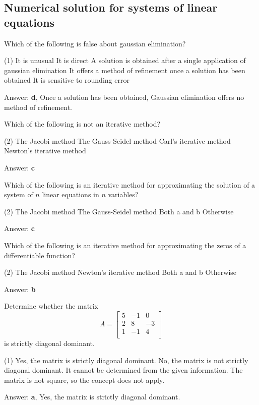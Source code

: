 \documentclass{exam}
\begin{document}
\begin{questions}
	\section{Numerical solution for systems of linear equations}

	\question Which of the following is false about gaussian elimination?
	\begin{tasks}(1)
		\task It is unusual
		\task It is direct
		\task A solution is obtained after a single application of gaussian elimination
		\task It offers a method of refinement once a solution has been obtained
		\task It is sensitive to rounding error
	\end{tasks}
	Answer: \textbf{d}, Once a solution has been obtained, Gaussian elimination offers no method of refinement.

	\question Which of the following is not an iterative method?
	\begin{tasks}(2)
		\task The Jacobi method
		\task The Gauss-Seidel method
		\task Carl’s iterative method
		\task Newton’s iterative method
	\end{tasks}
	Answer: \textbf{c}

	\question Which of the following is an iterative method for approximating the solution of a system of $n$ linear equations in $n$ variables?
	\begin{tasks}(2)
		\task The Jacobi method
		\task The Gauss-Seidel method
		\task Both a and b
		\task Otherwise
	\end{tasks}
	Answer: \textbf{c}

	\question Which of the following is an iterative method for approximating the zeros of a differentiable function?
	\begin{tasks}(2)
		\task The Jacobi method
		\task Newton’s iterative method
		\task Both a and b
		\task Otherwise
	\end{tasks}
	Answer: \textbf{b}

	\question Determine whether the matrix
	\[ A = \begin{bmatrix}
			5 & -1 & 0  \\
			2 & 8  & -3 \\
			1 & -1 & 4  \\
		\end{bmatrix} \]
	is strictly diagonal dominant.
	\begin{tasks}(1)
		\task Yes, the matrix is strictly diagonal dominant.
		\task No, the matrix is not strictly diagonal dominant.
		\task It cannot be determined from the given information.
		\task The matrix is not square, so the concept does not apply.
	\end{tasks}
	Answer: \textbf{a}, Yes, the matrix is strictly diagonal dominant.


\end{questions}
\end{document}
